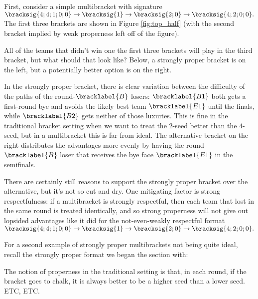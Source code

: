 {    First, consider a simple multibracket with signature $\bracksig{4;4;1;0;0} \to \bracksig{1} \to \bracksig{2;0} \to \bracksig{4;2;0;0}.$ The first three brackets are shown in Figure \ref{fig:top_half} (with the second bracket implied by weak properness left off of the figure).


    All of the teams that didn't win one the first three brackets will play in the third bracket, but what should that look like? Below, a strongly proper bracket is on the left, but a potentially better option is on the right.


    In the strongly proper bracket, there is clear variation between the difficulty of the paths of the round-$\bracklabel{B}$ losers: $\bracklabel{B1}$ both gets a first-round bye and avoids the likely best team $\bracklabel{E1}$ until the finals, while $\bracklabel{B2}$ gets neither of those luxuries. This is fine in the traditional bracket setting when we want to treat the $2$-seed better than the $4$-seed, but in a multibracket this is far from ideal. The alternative bracket on the right distributes the advantages more evenly by having the round-$\bracklabel{B}$ loser that receives the bye face $\bracklabel{E1}$ in the semifinals.
    
    There are certainly still reasons to support the strongly proper bracket over the alternative, but it's not so cut and dry. One mitigating factor is strong respectfulness: if a multibracket is strongly respectful, then each team that lost in the same round is treated identically, and so strong properness will not give out lopsided advantages like it did for the not-even-weakly respectful format $\bracksig{4;4;1;0;0} \to \bracksig{1} \to \bracksig{2;0} \to \bracksig{4;2;0;0}.$

    For a second example of strongly proper multibrackets not being quite ideal, recall the strongly proper format we began the section with:
    

    The notion of properness in the traditional setting is that, in each round, if the bracket goes to chalk, it is always better to be a higher seed than a lower seed. ETC, ETC.


}
